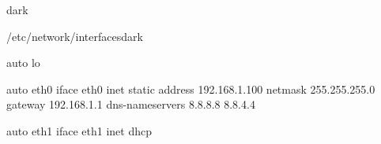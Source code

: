 \begin{baseBoxThree}{}{dark}
    \smallskip    
    \begin{baseBoxThree}{/etc/network/interfaces}{dark}
        \begin{posnex}
auto lo

auto eth0
iface eth0 inet static
    address 192.168.1.100
    netmask 255.255.255.0
    gateway 192.168.1.1
    dns-nameservers 8.8.8.8 8.8.4.4

auto eth1
iface eth1 inet dhcp
        \end{posnex}
    \end{baseBoxThree}
    \smallskip
\end{baseBoxThree}